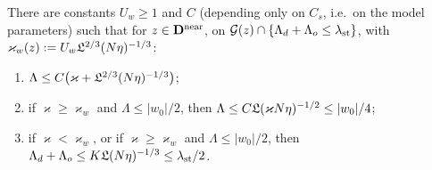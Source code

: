 \begin{lemma}\label{lem:weakdich}
There are constants $U_w\ge1$ and $C$ (depending only on $C_s$, i.e.\ on the model parameters) such that for $z\in\mathbf{D}^{\rm near}$, on $\mathcal{G}(z)\cap\{\Lambda_d+\Lambda_o\le\lambda_{\rm st}\}$, with $\varkappa_w(z):=U_w\mathfrak{L}^{2/3}(N\eta)^{-1/3}$:
\begin{enumerate}[label=\textup{(\alph*)},leftmargin=2.2em,itemsep=0pt]
\item $\Lambda\le C\big(\varkappa+\mathfrak{L}^{2/3}(N\eta)^{-1/3}\big)$;
\item if $\varkappa\ge\varkappa_w$ and $\Lambda\le|w_0|/2$, then $\Lambda\le C\mathfrak{L}(\varkappa N\eta)^{-1/2}\le|w_0|/4$;
\item if $\varkappa<\varkappa_w$, or if $\varkappa\ge\varkappa_w$ and $\Lambda\le|w_0|/2$, then
$\Lambda_d+\Lambda_o\le K\mathfrak{L}(N\eta)^{-1/3}\le\lambda_{\rm st}/2$.
\end{enumerate}
\end{lemma}
